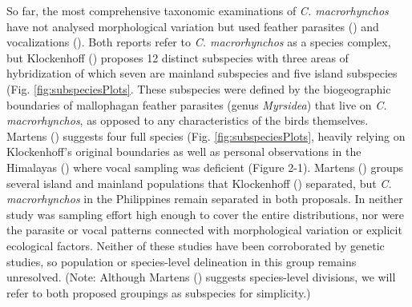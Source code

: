 \documentclass[10pt,a4paper]{article}
\begin{document}
So far, the most comprehensive taxonomic examinations of \emph{C. macrorhynchos} have not analysed morphological variation but used feather parasites () and vocalizations ().
Both reports refer to \emph{C. macrorhynchos} as a species complex, but Klockenhoff () proposes 12 distinct subspecies with three areas of hybridization of which seven are mainland subspecies and five island subspecies (Fig. \ref{fig:subspeciesPlots}.
These subspecies were defined by the biogeographic boundaries of mallophagan feather parasites (genus \emph{Myrsidea}) that live on \emph{C. macrorhynchos}, as opposed to any characteristics of the birds themselves.
Martens () suggests four full species (Fig. \ref{fig:subspeciesPlots}, heavily relying on Klockenhoff's original boundaries as well as personal observations in the Himalayas () where vocal sampling was deficient (Figure 2-1).
Martens () groups several island and mainland populations that Klockenhoff () separated, but \emph{C. macrorhynchos} in the Philippines remain separated in both proposals.
In neither study was sampling effort high enough to cover the entire distributions, nor were the parasite or vocal patterns connected with morphological variation or explicit ecological factors.
Neither of these studies have been corroborated by genetic studies, so population or species-level delineation in this group remains unresolved.
(Note: Although Martens () suggests species-level divisions, we will refer to both proposed groupings as subspecies for simplicity.)
\end{document}

